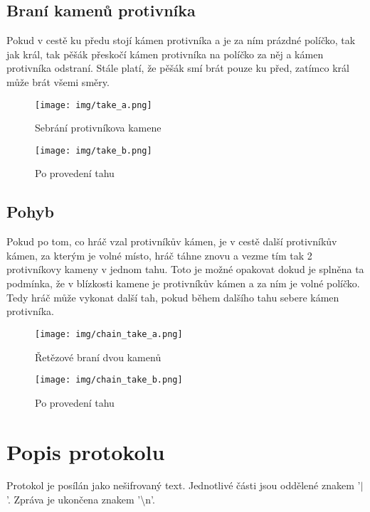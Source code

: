 \documentclass[12pt]{report}
\begin{document}
\section{Braní kamenů protivníka}
Pokud v cestě ku předu stojí kámen protivníka a je za ním prázdné políčko, tak jak král, tak pěšák 
přeskočí kámen protivníka na políčko za něj a kámen protivníka odstraní. Stále platí, že
pěšák smí brát pouze ku před, zatímco král může brát všemi směry.

\begin{figure}[H]
  \centering
  \begin{minipage}[b]{0.4\textwidth}
    \texttt{[image: img/take\_a.png]}
    \caption{Sebrání protivníkova kamene}
  \end{minipage}
  \hfill
  \begin{minipage}[b]{0.4\textwidth}
    \texttt{[image: img/take\_b.png]}
    \caption{Po provedení tahu}
  \end{minipage}
\end{figure}

\section{Pohyb}
Pokud po tom, co hráč vzal protivníkův kámen, je v cestě další protivníkův kámen, za kterým
je volné místo, hráč táhne znovu a vezme tím tak 2 protivníkovy kameny v jednom tahu. Toto
je možné opakovat dokud je splněna ta podmínka, že v blízkosti kamene je protivníkův kámen
a za ním je volné políčko. Tedy hráč může vykonat další tah, pokud během dalšího tahu sebere
kámen protivníka.

\begin{figure}[H]
  \centering
  \begin{minipage}[b]{0.4\textwidth}
    \texttt{[image: img/chain\_take\_a.png]}
    \caption{Řetězové braní dvou kamenů}
  \end{minipage}
  \hfill
  \begin{minipage}[b]{0.4\textwidth}
    \texttt{[image: img/chain\_take\_b.png]}
    \caption{Po provedení tahu}
  \end{minipage}
\end{figure}
%
%
%
\chapter{Popis protokolu}
Protokol je posílán jako nešifrovaný text. Jednotlivé části jsou oddělené znakem '$|$'. Zpráva
je ukončena znakem '\textbackslash n'.
%
%
\end{document}
